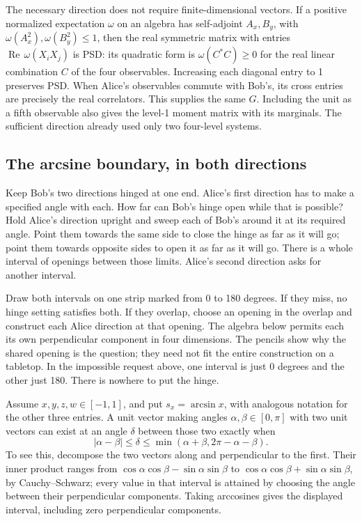 \documentclass[11pt,twoside]{article}
\theoremstyle{thielethm}
\theoremstyle{thieledef}
\theoremstyle{thieledef}
\theoremstyle{thieledef}
\theoremstyle{thielethm}
\theoremstyle{thieleobs}
\theoremstyle{thielethm}
\begin{document}
The necessary direction does not require finite-dimensional vectors. If a positive
normalized expectation $\omega$ on an algebra has self-adjoint $A_x,B_y$, with
$\omega(A_x^2),\omega(B_y^2)\le1$, then the real symmetric matrix with entries $\operatorname{Re}\,\omega(X_iX_j)$ is PSD: its quadratic form is $\omega(C^*C)\ge0$ for the real linear combination $C$
of the four observables. Increasing each diagonal entry to 1 preserves PSD. When
Alice's observables commute with Bob's, its cross entries are precisely the real
correlators. This supplies the same $G$. Including the unit as a fifth observable
also gives the level-1 moment matrix with its marginals. The sufficient direction
already used only two four-level systems.

\subsection{The arcsine boundary, in both directions}


Keep Bob's two directions hinged at one end. Alice's first direction has to make
a specified angle with each. How far can Bob's hinge open while that is possible?
Hold Alice's direction upright and sweep each of Bob's around it at its required
angle. Point them towards the same side to close the hinge as far as it will go;
point them towards opposite sides to open it as far as it will go. There is a
whole interval of openings between those limits. Alice's second direction asks
for another interval.

Draw both intervals on one strip marked from 0 to 180 degrees. If they miss, no
hinge setting satisfies both. If they overlap, choose an opening in the overlap
and construct each Alice direction at that opening. The algebra below permits
each its own perpendicular component in four dimensions. The pencils show why
the shared opening is the question; they need not fit the entire construction
on a tabletop. In the impossible request above, one interval is just 0 degrees
and the other just 180. There is nowhere to put the hinge.

Assume $x,y,z,w\in[-1,1]$, and put
$s_x=\arcsin x$, with analogous notation for the other three entries. A unit vector
making angles $\alpha,\beta\in[0,\pi]$ with two unit vectors can exist at an angle
$\delta$ between those two exactly when
\[
|\alpha-\beta|\le\delta\le
\min(\alpha+\beta,2\pi-\alpha-\beta).
\]
To see this, decompose the two vectors along and perpendicular to the first. Their
inner product ranges from $\cos\alpha\cos\beta-\sin\alpha\sin\beta$ to
$\cos\alpha\cos\beta+\sin\alpha\sin\beta$, by Cauchy--Schwarz; every value in that
interval is attained by choosing the angle between their perpendicular components.
Taking arccosines gives the displayed interval, including zero perpendicular components.
\end{document}
